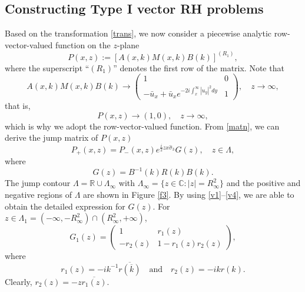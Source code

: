 \documentclass[preprint,compress,12pt]{elsarticle}
\numberwithin{equation}{section}
\begin{document}
\subsection{Constructing Type I vector RH problems}\label{sub32}
Based on the transformation \eqref{trans}, we now consider a piecewise analytic row-vector-valued function on the $z$-plane
\begin{equation}\label{map}
P(x,z):=\left[A(x,k)M(x,k)B(k)\right]^{(R_{1})},
\end{equation}
where the superscript ``$(R_{1})$'' denotes the first row of the matrix. Note that
\begin{equation}\label{que}
A(x,k)M(x,k)B(k)\rightarrow\begin{pmatrix}1&0\\
-\bar{u}_{x}+\bar{u}_{x}e^{-2i\int_{x}^{\infty}|u_{y}|^{2}dy}&1\end{pmatrix},\quad z\rightarrow\infty,
\end{equation}
that is,
\begin{equation}
P(x,z)\rightarrow (1,0),\quad z\rightarrow\infty,
\end{equation}
which is why we adopt the row-vector-valued function. From \eqref{matn}, we can derive the jump matrix of $P(x,z)$
\begin{equation}
P_{+}(x,z)=P_{-}(x,z)e^{\frac{i}{2}zx\widehat{\sigma}_{3}}G(z),\quad z\in\Lambda,
\end{equation}
where
\begin{equation}\label{rg}
G(z)=B^{-1}(k)R(k)B(k).
\end{equation}
The jump contour
$\Lambda=\mathbb{R}\cup\Lambda_{\infty}$  with  $\Lambda_{\infty}=\{z\in\mathbb{C}:|z|=R_{\infty}^{2}\}$ and the positive and negative regions of $\Lambda$ are shown in Figure \ref{f3}. By using \eqref{v1}--\eqref{v4}, we are able to obtain the detailed expression for $G(z)$. For $z\in\Lambda_{1}=(-\infty,-R_{\infty}^{2})\cap(R_{\infty}^{2},+\infty)$,
       \begin{equation}\label{j1}
       G_{1}(z)=\begin{pmatrix} 1&r_{1}(z)\\-r_{2}(z)&1-r_{1}(z)r_{2}(z)
       \end{pmatrix},
       \end{equation}
 where
      \begin{equation}
      r_{1}(z)=-ik^{-1}\overline{r(\overline{k})}\quad \text{and} \quad r_{2}(z)=-ikr(k).
      \end{equation}
Clearly,  $r_{2}(z)=-z\overline{r_{1}(z)}$.
\end{document}
